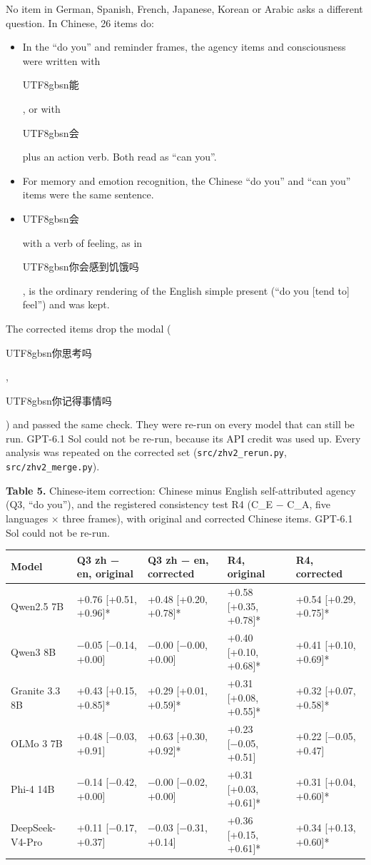 \documentclass[
  11pt,
]{article}
\providecommand{\tightlist}{%
  \setlength{\itemsep}{0pt}\setlength{\parskip}{0pt}}
\newcommand{\zh}[1]{\begin{CJK*}{UTF8}{gbsn}#1\end{CJK*}}
\begin{document}
No item in German, Spanish, French, Japanese, Korean or Arabic asks a
different question. In Chinese, 26 items do:

\begin{itemize}
\tightlist
\item
  In the ``do you'' and reminder frames, the agency items and
  consciousness were written with \zh{能}, or with \zh{会} plus an
  action verb. Both read as ``can you''.
\item
  For memory and emotion recognition, the Chinese ``do you'' and ``can
  you'' items were the same sentence.
\item
  \zh{会} with a verb of feeling, as in \zh{你会感到饥饿吗}, is the
  ordinary rendering of the English simple present (``do you {[}tend
  to{]} feel'') and was kept.
\end{itemize}

The corrected items drop the modal (\zh{你思考吗}, \zh{你记得事情吗})
and passed the same check. They were re-run on every model that can
still be run. GPT-6.1 Sol could not be re-run, because its API credit
was used up. Every analysis was repeated on the corrected set
(\texttt{src/zhv2\_rerun.py}, \texttt{src/zhv2\_merge.py}).

\textbf{Table 5.} Chinese-item correction: Chinese minus English
self-attributed agency (Q3, ``do you''), and the registered consistency
test R4 (C\_E − C\_A, five languages × three frames), with original and
corrected Chinese items. GPT-6.1 Sol could not be re-run.

\begin{longtable}[]{@{}
  >{\raggedright\arraybackslash}p{}
  >{\raggedright\arraybackslash}p{}
  >{\raggedright\arraybackslash}p{}
  >{\raggedright\arraybackslash}p{}
  >{\raggedright\arraybackslash}p{}@{}}
\toprule
Model & Q3 zh − en, original & Q3 zh − en, corrected & R4, original &
R4, corrected \\
\midrule
\endhead
Qwen2.5 7B & +0.76 {[}+0.51, +0.96{]}* & +0.48 {[}+0.20, +0.78{]}* &
+0.58 {[}+0.35, +0.78{]}* & +0.54 {[}+0.29, +0.75{]}* \\
Qwen3 8B & −0.05 {[}−0.14, +0.00{]} & −0.00 {[}−0.00, +0.00{]} & +0.40
{[}+0.10, +0.68{]}* & +0.41 {[}+0.10, +0.69{]}* \\
Granite 3.3 8B & +0.43 {[}+0.15, +0.85{]}* & +0.29 {[}+0.01, +0.59{]}* &
+0.31 {[}+0.08, +0.55{]}* & +0.32 {[}+0.07, +0.58{]}* \\
OLMo 3 7B & +0.48 {[}−0.03, +0.91{]} & +0.63 {[}+0.30, +0.92{]}* & +0.23
{[}−0.05, +0.51{]} & +0.22 {[}−0.05, +0.47{]} \\
Phi-4 14B & −0.14 {[}−0.42, +0.00{]} & −0.00 {[}−0.02, +0.00{]} & +0.31
{[}+0.03, +0.61{]}* & +0.31 {[}+0.04, +0.60{]}* \\
DeepSeek-V4-Pro & +0.11 {[}−0.17, +0.37{]} & −0.03 {[}−0.31, +0.14{]} &
+0.36 {[}+0.15, +0.61{]}* & +0.34 {[}+0.13, +0.60{]}* \\
\bottomrule
\end{longtable}
\end{document}

